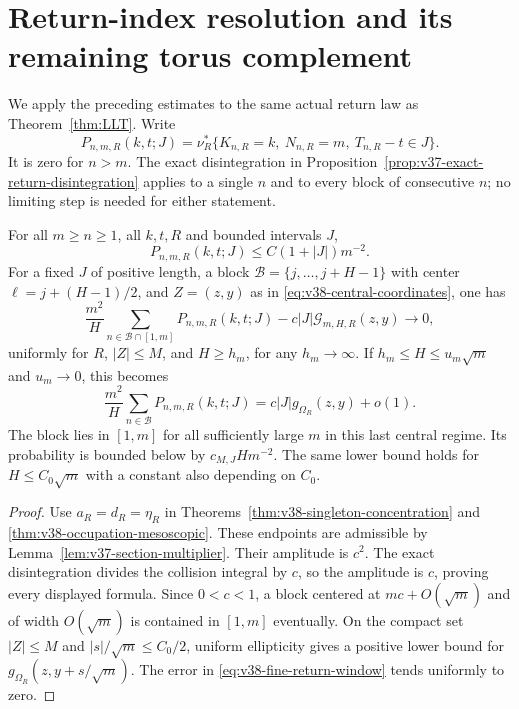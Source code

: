 \section{Return-index resolution and its remaining torus complement}
\label{sec:v38-return-resolution}
We apply the preceding estimates to the same actual return law as
Theorem~\ref{thm:LLT}. Write
\begin{equation}\label{eq:v38-return-mass}
 P_{n,m,R}(k,t;J)=
 \nu_R^*\{K_{n,R}=k,\ N_{n,R}=m,\ T_{n,R}-t\in J\}.
\end{equation}
It is zero for $n>m$. The exact disintegration in
Proposition~\ref{prop:v37-exact-return-disintegration} applies to a
single $n$ and to every block of consecutive $n$; no limiting step is
needed for either statement.

\begin{theorem}
\label{thm:v38-fine-return-windows}
For all $m\ge n\ge1$, all $k,t,R$ and bounded intervals $J$,
\begin{equation}\label{eq:v38-actual-singleton-upper}
 P_{n,m,R}(k,t;J)\le C(1+|J|)m^{-2}.
\end{equation}
For a fixed $J$ of positive length, a block
$\mathcal B=\{j,\ldots,j+H-1\}$ with center $\ell=j+(H-1)/2$, and
$Z=(z,y)$ as in \eqref{eq:v38-central-coordinates}, one has
\begin{equation}\label{eq:v38-fine-return-window}
 \frac{m^2}{H}\sum_{n\in\mathcal B\cap[1,m]}P_{n,m,R}(k,t;J)
       -c|J|\mathcal G_{m,H,R}(z,y)\longrightarrow0,
\end{equation}
uniformly for $R$, $|Z|\le M$, and $H\ge h_m$, for any $h_m\to\infty$.
If $h_m\le H\le u_m\sqrt m$ and $u_m\to0$, this becomes
\begin{equation}\label{eq:v38-subdiffusive-return}
 \frac{m^2}{H}\sum_{n\in\mathcal B}P_{n,m,R}(k,t;J)
       =c|J|g_{\Omega_R}(z,y)+o(1).
\end{equation}
The block lies in $[1,m]$ for all sufficiently large $m$ in this last
central regime. Its probability is bounded below by $c_{M,J}Hm^{-2}$.
The same lower bound holds for $H\le C_0\sqrt m$ with a constant
also depending on $C_0$.
\end{theorem}
\begin{proof}
Use $a_R=d_R=\eta_R$ in
Theorems~\ref{thm:v38-singleton-concentration} and
\ref{thm:v38-occupation-mesoscopic}. These endpoints are admissible
by Lemma~\ref{lem:v37-section-multiplier}. Their amplitude is $c^2$.
The exact disintegration divides the collision integral by $c$, so
the amplitude is $c$, proving every displayed formula. Since
$0<c<1$, a block centered at $mc+O(\sqrt m)$ and of width
$O(\sqrt m)$ is contained in $[1,m]$ eventually. On the compact set
$|Z|\le M$ and $|s|/\sqrt m\le C_0/2$, uniform ellipticity gives a
positive lower bound for $g_{\Omega_R}(z,y+s/\sqrt m)$. The error
in \eqref{eq:v38-fine-return-window} tends uniformly to zero.
\end{proof}

